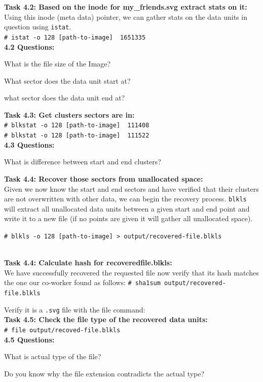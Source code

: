 \documentclass[a4paper,11pt]{article}
\begin{document}
{\noindent
\textbf{Task 4.2: Based on the inode for my\_friends.svg extract stats on it:}\\
Using this inode (meta data) pointer, we can gather stats on the data units in question using \texttt{istat}.\\
\verb|# istat -o 128 [path-to-image]  1651335|\\

\noindent
\textbf{4.2 Questions:}
\begin{enumerate*}
	\item What is the file size of the Image?
	\item What sector does the data unit start at?
	\item what sector does the data unit end at?\\
\end{enumerate*}	
}
{\noindent
\textbf{Task 4.3: Get clusters sectors are in:}\\
\verb|# blkstat -o 128 [path-to-image]  111408|\\
\noindent
\verb|# blkstat -o 128 [path-to-image]  111522|\\

\noindent
\textbf{4.3 Questions:}
\begin{enumerate*}
	\item What is difference between start and end clusters?\\
\end{enumerate*}	
}
{\noindent
\textbf{Task 4.4: Recover those sectors from unallocated space:}\\
Given we now know the start and end sectors and have verified that their clusters are not overwritten with other data, we can begin the recovery process.
\texttt{blkls} will extract all unallocated data units between a given start and end point and write it to a new file (if no points are given it will gather all unallocated space). 

\verb|# blkls -o 128 [path-to-image] > output/recovered-file.blkls|
}\\

{\noindent
\textbf{Task 4.4: Calculate hash for recoveredfile.blkls:}\\
We have successfully recovered the requested file now verify that its hash matches the one our co-worker found as follows:
\verb|# sha1sum output/recovered-file.blkls|
}\\

{\noindent
Verify it is a \texttt{.svg} file with the file command:\\
\textbf{Task 4.5: Check the file type of the recovered data units:}\\
\verb|# file output/recoved-file.blkls|\\

\textbf{4.5 Questions:}
\begin{enumerate*}
	\item What is actual type of the file?
	\item Do you know why the file extension contradicts the actual type?\\
\end{enumerate*}	
}
\end{document}
